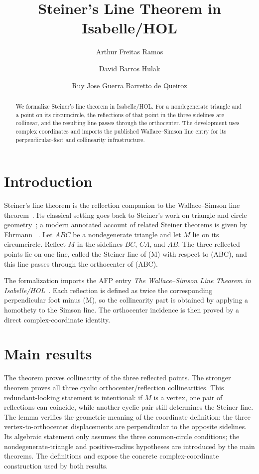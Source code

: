 \documentclass[11pt,a4paper]{article}
\begin{document}
\title{Steiner's Line Theorem in Isabelle/HOL}
\author{Arthur Freitas Ramos \and David Barros Hulak \and Ruy Jose Guerra Barretto de Queiroz}

\maketitle

\begin{abstract}
We formalize Steiner's line theorem in Isabelle/HOL.  For a nondegenerate
triangle and a point on its circumcircle, the reflections of that point in the
three sidelines are collinear, and the resulting line passes through the
orthocenter.  The development uses complex coordinates and imports the
published Wallace--Simson line entry for its perpendicular-foot and
collinearity infrastructure.
\end{abstract}

\section{Introduction}

Steiner's line theorem is the reflection companion to the Wallace--Simson
line theorem~\cite{CoxeterGreitzer1967}.  Its classical setting goes back to
Steiner's work on triangle and circle geometry~\cite{Steiner1826}; a modern
annotated account of related Steiner theorems is given by Ehrmann
~\cite{Ehrmann2004}.  Let $ABC$ be a nondegenerate
triangle and let $M$ lie on its circumcircle.  Reflect $M$ in the sidelines
$BC$, $CA$, and $AB$.  The
three reflected points lie on one line, called the Steiner line of (M) with
respect to (ABC), and this line passes through the orthocenter of (ABC).

The formalization imports the AFP entry \emph{The Wallace--Simson Line
Theorem in Isabelle/HOL}~\cite{Simson-AFP}.  Each reflection is defined as
twice the corresponding perpendicular foot minus (M), so the collinearity
part is obtained by applying a homothety to the Simson line.  The
orthocenter incidence is then proved by a direct complex-coordinate identity.

\section{Main results}

The theorem  proves collinearity of the three reflected
points.  The stronger theorem 
proves all three cyclic orthocenter/reflection collinearities.  This
redundant-looking statement is intentional: if $M$ is a vertex, one pair of
reflections can coincide, while another cyclic pair still determines the
Steiner line.  The lemma  verifies the
geometric meaning of the coordinate definition: the three
vertex-to-orthocenter displacements are perpendicular to the opposite
sidelines.  Its algebraic statement only assumes the three common-circle
conditions; the nondegenerate-triangle and positive-radius hypotheses are
introduced by the main theorems.  The definitions
 and  expose the concrete
complex-coordinate construction used by both results.





\end{document}
